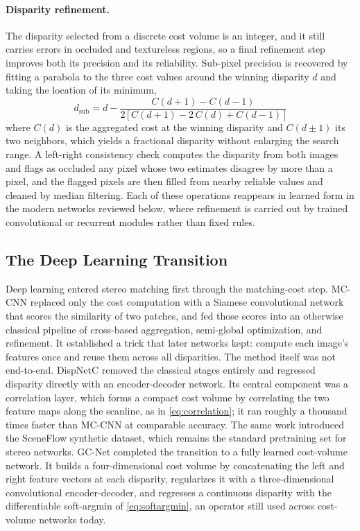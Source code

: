 \paragraph{Disparity refinement.}
The disparity selected from a discrete cost volume is an integer, and it
still carries errors in occluded and textureless regions, so a final
refinement step improves both its precision and its reliability. Sub-pixel
precision is recovered by fitting a parabola to the three cost values
around the winning disparity $d$ and taking the location of its minimum,
\begin{equation}
d_{\text{sub}} = d - \frac{C(d + 1) - C(d - 1)}{2\,\big[\,C(d + 1) - 2\,C(d) + C(d - 1)\,\big]}
\label{eq:subpixel}
\end{equation}
where $C(d)$ is the aggregated cost at the winning disparity and
$C(d \pm 1)$ its two neighbors, which yields a fractional disparity without
enlarging the search range. A left-right consistency check computes the
disparity from both images and flags as occluded any pixel whose two
estimates disagree by more than a pixel, and the flagged pixels are then
filled from nearby reliable values and cleaned by median filtering. Each of
these operations reappears in learned form in the modern networks reviewed
below, where refinement is carried out by trained convolutional or
recurrent modules rather than fixed rules.

\FloatBarrier
\subsection{The Deep Learning Transition}
Deep learning entered stereo matching first through the matching-cost
step. MC-CNN \cite{zbontar2016mccnn} replaced only the cost computation
with a Siamese convolutional network that scores the similarity of two
patches, and fed those scores into an otherwise classical pipeline of
cross-based aggregation, semi-global optimization, and refinement. It
established a trick that later networks kept: compute each image's
features once and reuse them across all disparities. The method itself
was not end-to-end. DispNetC \cite{mayer2016sceneflow} removed the
classical stages entirely and regressed disparity directly with an
encoder-decoder network. Its central component was a correlation layer,
which forms a compact cost volume by correlating the two feature maps
along the scanline, as in \eqref{eq:correlation}; it ran roughly a
thousand times faster than MC-CNN at comparable accuracy. The same work
introduced the SceneFlow synthetic dataset, which remains the standard
pretraining set for stereo networks. GC-Net \cite{kendall2017gcnet}
completed the transition to a fully learned cost-volume network. It
builds a four-dimensional cost volume by concatenating the left and right
feature vectors at each disparity, regularizes it with a
three-dimensional convolutional encoder-decoder, and regresses a
continuous disparity with the differentiable soft-argmin of
\eqref{eq:softargmin}, an operator still used across cost-volume networks
today.

